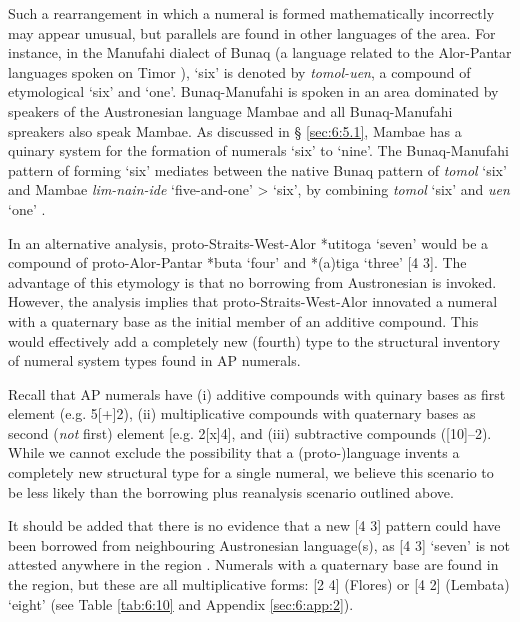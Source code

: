 Such a rearrangement in which a numeral is formed mathematically incorrectly may appear unusual, but parallels are found in other languages of the area. For instance, in the Manufahi dialect of Bunaq (a language related to the Alor-Pantar languages spoken on Timor \citep{Schapper2009}), `six' is denoted by \textit{tomol-uen}, a compound of etymological `six' and `one'. Bunaq-Manufahi is spoken in an area dominated by speakers of the Austronesian language Mambae and all Bunaq-Manufahi spreakers also speak Mambae. As discussed in {\S} \ref{sec:6:5.1}, Mambae has a quinary system for the formation of numerals `six' to `nine'. The Bunaq-Manufahi pattern of forming `six' mediates between the native Bunaq pattern of \textit{tomol} `six' and Mambae \textit{lim-nain-ide} `five-and-one' {\textgreater} `six', by combining \textit{tomol} `six' and \textit{uen} `one' .

In an alternative analysis, proto-Straits-West-Alor *{\texthtb}utitoga `seven' would be a compound of proto-Alor-Pantar *buta `four' and *(a)tiga `three' [4 3]. The advantage of this etymology is that no borrowing from Austronesian is invoked. However, the analysis implies that proto-Straits-West-Alor innovated a numeral with a quaternary base as the initial member of an additive compound. This would effectively add a completely new (fourth) type to the structural inventory of numeral system types found in AP numerals. 

Recall that AP numerals have (i) additive compounds with quinary bases as first element (e.g. 5[+]2), (ii) multiplicative compounds with quaternary bases as second (\textit{not} first) element [e.g. 2[x]4], and (iii) subtractive compounds ([10]--2). While we cannot exclude the possibility that a (proto-)language invents a completely new structural type for a single numeral, we believe this scenario to be less likely than the borrowing plus reanalysis scenario outlined above. 

It should be added that there is no evidence that a new [4 3] pattern could have been borrowed from neighbouring Austronesian language(s), as [4 3] `seven' is not attested anywhere in the region \citep{SchapperEtAl2013}. Numerals with a quaternary base are found in the region, but these are all multiplicative forms: [2 4] (Flores) or [4 2] (Lembata) `eight' (see Table \ref{tab:6:10}  and Appendix \ref{sec:6:app:2}). 

